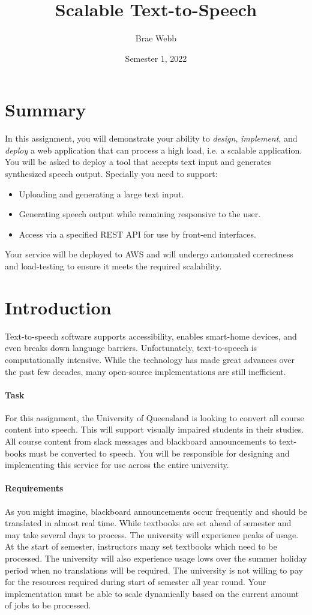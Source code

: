 \documentclass{csse4400}
\title{Scalable Text-to-Speech}
\author{Brae Webb}
\date{Semester 1, 2022}
\begin{document}
\maketitle

\section*{Summary}
In this assignment, you will demonstrate your ability to \textsl{design},
\textsl{implement}, and \textsl{deploy} a web application that can process a high load,
i.e. a scalable application.
You will be asked to deploy a tool that accepts text input and generates synthesized speech output.
Specially you need to support:
\begin{itemize}
    \item Uploading and generating a large text input.
    \item Generating speech output while remaining responsive to the user.
    \item Access via a specified REST API for use by front-end interfaces.
\end{itemize}

Your service will be deployed to AWS and will undergo automated correctness and load-testing to ensure it meets the required scalability.

\section{Introduction}
Text-to-speech software supports accessibility,
enables smart-home devices,
and even breaks down language barriers.
Unfortunately, text-to-speech is computationally intensive.
While the technology has made great advances over the past few decades,
many open-source implementations are still inefficient.

\paragraph{Task}
For this assignment,
the University of Queensland is looking to convert all course content into speech.
This will support visually impaired students in their studies.
All course content from slack messages and blackboard announcements to text-books must be converted to speech.
You will be responsible for designing and implementing this service for use across the entire university.

\paragraph{Requirements}
As you might imagine,
blackboard announcements occur frequently and should be translated in almost real time.
While textbooks are set ahead of semester and may take several days to process.
The university will experience peaks of usage.
At the start of semester,
instructors many set textbooks which need to be processed.
The university will also experience usage lows over the summer holiday period when no translations will be required.
The university is not willing to pay for the resources required during start of semester all year round.
Your implementation must be able to scale dynamically based on the current amount of jobs to be processed.
\end{document}
